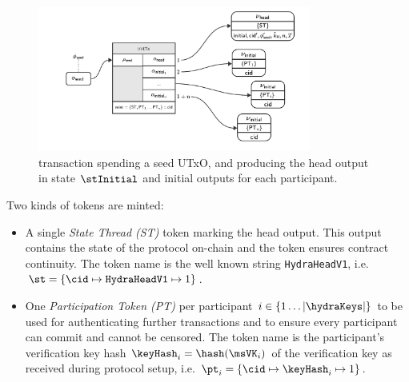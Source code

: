 \begin{figure}
	\centering
        \includegraphics[width=0.8\textwidth]{Hydra/Protocol/Figures/initTx.pdf}
	\caption{\mtxInit{} transaction spending a seed UTxO, and producing the head
		output in state $\stInitial$ and initial outputs for each participant.}\label{fig:initTx}
\end{figure}

\noindent Two kinds of tokens are minted:
\begin{itemize}
	\item A single \emph{State Thread (ST)} token marking the head output. This
	      output contains the state of the protocol on-chain and the token ensures
	      contract continuity. The token name is the well known string
	      \texttt{HydraHeadV1}, i.e.
	      $\st = \{\cid \mapsto \texttt{HydraHeadV1} \mapsto 1\}$.
	\item One \emph{Participation Token (PT)} per participant
	      $i \in \{1 \dots |\hydraKeys|  \}$ to be used for authenticating further
	      transactions and to ensure every participant can commit and cannot be
	      censored. The token name is the participant's verification key hash
	      $\keyHash_{i} = \hash(\msVK_{i})$ of the verification key as received
	      during protocol setup, i.e.
	      $\pt_{i} = \{\cid \mapsto \keyHash_{i} \mapsto 1\}$.
\end{itemize}

